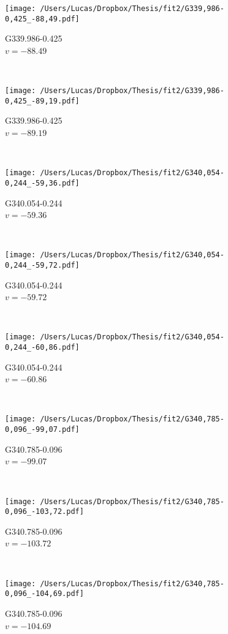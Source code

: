 \begin{figure*}[t]\ContinuedFloat
	\centering
	\begin{subfigure}[t]{0.3\textwidth}
		\texttt{[image: /Users/Lucas/Dropbox/Thesis/fit2/G339,986-0,425\_-88,49.pdf]}
		\caption[]{G339.986-0.425\\$v=-88.49$\,\kms}
	\end{subfigure}
	~
	\begin{subfigure}[t]{0.3\textwidth}
		\texttt{[image: /Users/Lucas/Dropbox/Thesis/fit2/G339,986-0,425\_-89,19.pdf]}
		\caption[]{G339.986-0.425\\$v=-89.19$\,\kms}
	\end{subfigure}
	~
	\begin{subfigure}[t]{0.3\textwidth}
		\texttt{[image: /Users/Lucas/Dropbox/Thesis/fit2/G340,054-0,244\_-59,36.pdf]}
		\caption[]{G340.054-0.244\\$v=-59.36$\,\kms}
	\end{subfigure}
	~
	\begin{subfigure}[t]{0.3\textwidth}
		\texttt{[image: /Users/Lucas/Dropbox/Thesis/fit2/G340,054-0,244\_-59,72.pdf]}
		\caption[]{G340.054-0.244\\$v=-59.72$\,\kms}
	\end{subfigure}
	~
	\begin{subfigure}[t]{0.3\textwidth}
		\texttt{[image: /Users/Lucas/Dropbox/Thesis/fit2/G340,054-0,244\_-60,86.pdf]}
		\caption[]{G340.054-0.244\\$v=-60.86$\,\kms}
	\end{subfigure}
	~
	\begin{subfigure}[t]{0.3\textwidth}
		\texttt{[image: /Users/Lucas/Dropbox/Thesis/fit2/G340,785-0,096\_-99,07.pdf]}
		\caption[]{G340.785-0.096\\$v=-99.07$\,\kms}
	\end{subfigure}
	~
	\begin{subfigure}[t]{0.3\textwidth}
		\texttt{[image: /Users/Lucas/Dropbox/Thesis/fit2/G340,785-0,096\_-103,72.pdf]}
		\caption[]{G340.785-0.096\\$v=-103.72$\,\kms}
	\end{subfigure}
	~
	\begin{subfigure}[t]{0.3\textwidth}
		\texttt{[image: /Users/Lucas/Dropbox/Thesis/fit2/G340,785-0,096\_-104,69.pdf]}
		\caption[]{G340.785-0.096\\$v=-104.69$\,\kms}

\end{subfigure}
\end{figure*}
